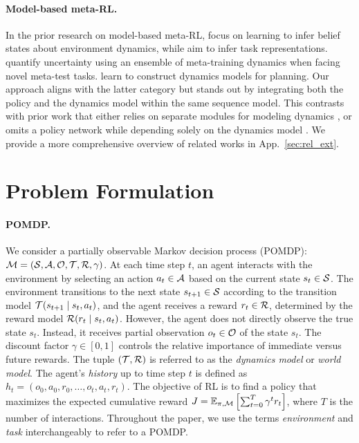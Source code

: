 \documentclass{article}
\begin{document}
\paragraph*{Model-based meta-RL.}
In the prior research on model-based meta-RL, 
\cite{VariBAD,HyperX,BOReL} focus on learning to infer belief states about environment dynamics, while \citet{MoSS} aim to infer task representations.
\citet{IDAQ} quantify uncertainty using an ensemble of meta-training dynamics when facing novel meta-test tasks.
\citet{ReBAL,TFsearch,MAMBA} learn to construct dynamics models for planning.
Our approach aligns with the latter category but stands out by integrating both the policy and the dynamics model within the same sequence model.
This contrasts with prior work that either relies on separate modules for modeling dynamics \citep{ReBAL,MAMBA}, or omits a policy network while depending solely on the dynamics model \citep{TFsearch}.
We provide a more comprehensive overview of related works in App.~\ref{sec:rel_ext}.


\section{Problem Formulation}
\label{sec:back}

\paragraph*{POMDP.}
We consider a partially observable Markov decision process (POMDP): ${\mathcal{M}} = ({\mathcal{S}}, {\mathcal{A}}, {\mathcal{O}}, {\mathcal{T}}, {\mathcal{R}}, \gamma)$.
At each time step $t$, an agent interacts with the environment by selecting an action $a_t \in {\mathcal{A}}$ based on the current state $s_t \in {\mathcal{S}}$.
The environment transitions to the next state $s_{t+1} \in {\mathcal{S}}$ according to the transition model ${\mathcal{T}}(s_{t+1} \mid s_t, a_t)$, and the agent receives a reward $r_t \in {\mathcal{R}}$, determined by the reward model ${\mathcal{R}}(r_t \mid s_t, a_t)$.
However, the agent does not directly observe the true state $s_t$.
Instead, it receives partial observation $o_t \in {\mathcal{O}}$ of the state $s_t$.
The discount factor $\gamma \in [0, 1]$ controls the relative importance of immediate versus future rewards.
The tuple $({\mathcal{T}}, {\mathcal{R}})$ is referred to as the \emph{dynamics model} or \emph{world model}.
The agent's \emph{history} up to time step $t$ is defined as $h_t = (o_0, a_0, r_0, \dots, o_t, a_t, r_t)$.
The objective of RL is to find a policy that maximizes the expected cumulative reward $J = \mathbb{E}_{\pi,{\mathcal{M}}} \left[ \sum_{t=0}^T \gamma^t r_t \right]$, where $T$ is the  number of interactions.
Throughout the paper, we use the terms \emph{environment} and \emph{task} interchangeably to refer to a POMDP.
\end{document}
